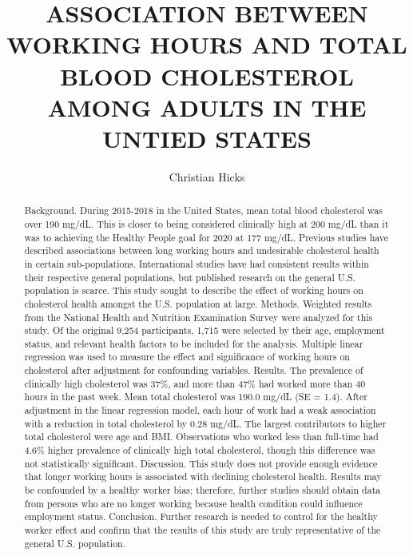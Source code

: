 \documentclass[]{elsarticle} %
\begin{document}
\begin{frontmatter}

  \title{ASSOCIATION BETWEEN WORKING HOURS AND TOTAL BLOOD CHOLESTEROL
AMONG ADULTS IN THE UNTIED STATES}
    \author[San Diego State University School of Public
Health]{Christian Hicks}
      
  \begin{abstract}
  Background. During 2015-2018 in the United States, mean total blood
  cholesterol was over 190 mg/dL. This is closer to being considered
  clinically high at 200 mg/dL than it was to achieving the Healthy
  People goal for 2020 at 177 mg/dL. Previous studies have described
  associations between long working hours and undesirable cholesterol
  health in certain sub-populations. International studies have had
  consistent results within their respective general populations, but
  published research on the general U.S. population is scarce. This
  study sought to describe the effect of working hours on cholesterol
  health amongst the U.S. population at large. Methods. Weighted results
  from the National Health and Nutrition Examination Survey were
  analyzed for this study. Of the original 9,254 participants, 1,715
  were selected by their age, employment status, and relevant health
  factors to be included for the analysis. Multiple linear regression
  was used to measure the effect and significance of working hours on
  cholesterol after adjustment for confounding variables. Results. The
  prevalence of clinically high cholesterol was 37\%, and more than 47\%
  had worked more than 40 hours in the past week. Mean total cholesterol
  was 190.0 mg/dL (SE = 1.4). After adjustment in the linear regression
  model, each hour of work had a weak association with a reduction in
  total cholesterol by 0.28 mg/dL. The largest contributors to higher
  total cholesterol were age and BMI. Observations who worked less than
  full-time had 4.6\% higher prevalence of clinically high total
  cholesterol, though this difference was not statistically significant.
  Discussion. This study does not provide enough evidence that longer
  working hours is associated with declining cholesterol health. Results
  may be confounded by a healthy worker bias; therefore, further studies
  should obtain data from persons who are no longer working because
  health condition could influence employment status. Conclusion.
  Further research is needed to control for the healthy worker effect
  and confirm that the results of this study are truly representative of
  the general U.S. population.
  \end{abstract}
  
 \end{frontmatter}
\end{document}
